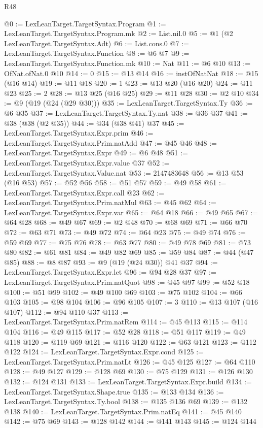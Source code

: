 \begin{lexlean}{R48}
\begin{coremodule}
@0 := LexLeanTarget.TargetSyntax.Program
@1 := LexLeanTarget.TargetSyntax.Program.mk
@2 := List.nil.{0}
@5 := @1 (@2 LexLeanTarget.TargetSyntax.Adt)
@6 := List.cons.{0}
@7 := LexLeanTarget.TargetSyntax.Function
@8 := @6 @7
@9 := LexLeanTarget.TargetSyntax.Function.mk
@10 := Nat
@11 := @6 @10
@13 := OfNat.ofNat.{0} @10
@14 := 0
@15 := @13 @14
@16 := instOfNatNat
@18 := @15 (@16 @14)
@19 := @11 @18
@20 := 1
@23 := @13 @20 (@16 @20)
@24 := @11 @23
@25 := 2
@28 := @13 @25 (@16 @25)
@29 := @11 @28
@30 := @2 @10
@34 := @9 (@19 (@24 (@29 @30)))
@35 := LexLeanTarget.TargetSyntax.Ty
@36 := @6 @35
@37 := LexLeanTarget.TargetSyntax.Ty.nat
@38 := @36 @37
@41 := @38 (@38 (@2 @35))
@44 := @34 (@38 @41) @37
@45 := LexLeanTarget.TargetSyntax.Expr.prim
@46 := LexLeanTarget.TargetSyntax.Prim.natAdd
@47 := @45 @46
@48 := LexLeanTarget.TargetSyntax.Expr
@49 := @6 @48
@51 := LexLeanTarget.TargetSyntax.Expr.value @37
@52 := LexLeanTarget.TargetSyntax.Value.nat
@53 := 2147483648
@56 := @13 @53 (@16 @53)
@57 := @52 @56
@58 := @51 @57
@59 := @49 @58
@61 := LexLeanTarget.TargetSyntax.Expr.call @23
@62 := LexLeanTarget.TargetSyntax.Prim.natMul
@63 := @45 @62
@64 := LexLeanTarget.TargetSyntax.Expr.var
@65 := @64 @18
@66 := @49 @65
@67 := @64 @28
@68 := @49 @67
@69 := @2 @48
@70 := @68 @69
@71 := @66 @70
@72 := @63 @71
@73 := @49 @72
@74 := @64 @23
@75 := @49 @74
@76 := @59 @69
@77 := @75 @76
@78 := @63 @77
@80 := @49 @78 @69
@81 := @73 @80
@82 := @61 @81
@84 := @49 @82 @69
@85 := @59 @84
@87 := @44 (@47 @85)
@88 := @8 @87
@93 := @9 (@19 (@24 @30)) @41 @37
@94 := LexLeanTarget.TargetSyntax.Expr.let
@96 := @94 @28 @37
@97 := LexLeanTarget.TargetSyntax.Prim.natQuot
@98 := @45 @97
@99 := @52 @18
@100 := @51 @99
@102 := @49 @100 @69
@103 := @75 @102
@104 := @66 @103
@105 := @98 @104
@106 := @96 @105
@107 := 3
@110 := @13 @107 (@16 @107)
@112 := @94 @110 @37
@113 := LexLeanTarget.TargetSyntax.Prim.natRem
@114 := @45 @113
@115 := @114 @104
@116 := @49 @115
@117 := @52 @28
@118 := @51 @117
@119 := @49 @118
@120 := @119 @69
@121 := @116 @120
@122 := @63 @121
@123 := @112 @122
@124 := LexLeanTarget.TargetSyntax.Expr.cond
@125 := LexLeanTarget.TargetSyntax.Prim.natLt
@126 := @45 @125
@127 := @64 @110
@128 := @49 @127
@129 := @128 @69
@130 := @75 @129
@131 := @126 @130
@132 := @124 @131
@133 := LexLeanTarget.TargetSyntax.Expr.build
@134 := LexLeanTarget.TargetSyntax.Shape.true
@135 := @133 @134
@136 := LexLeanTarget.TargetSyntax.Ty.bool
@138 := @135 @136 @69
@139 := @132 @138
@140 := LexLeanTarget.TargetSyntax.Prim.natEq
@141 := @45 @140
@142 := @75 @69
@143 := @128 @142
@144 := @141 @143
@145 := @124 @144

\end{coremodule}
\end{lexlean}
